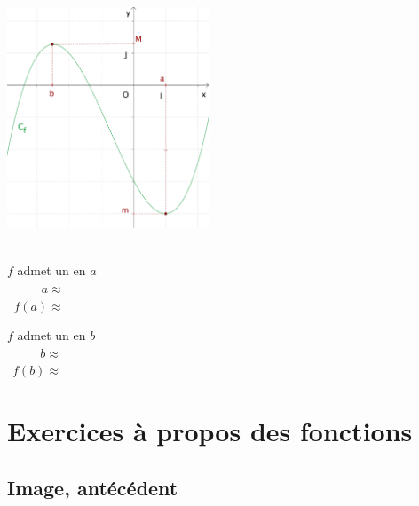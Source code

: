 \begin{minipage}[c]{0.4\linewidth}
  \centering
  \includegraphics[width=6cm]{F_Extrema.pdf}
\end{minipage}
\quad
\begin{minipage}[c]{0.4\linewidth}
  \centering
  \ \\
  $f$ admet un \hspace{2cm} en $a$  \\[2ex]
  $\phantom{f(a)}a\approx$ \\[2ex]
  $\phantom{a}f(a)\approx $ \\[2em]
  
  \bigskip

  $f$ admet un \hspace{2cm} en $b$  \\[2ex]
  $\phantom{f(b)}b\approx$ \\[2ex]
  $\phantom{b}f(b)\approx $   
\end{minipage}

\section{Exercices à propos des fonctions}

\subsection{Image, antécédent}

